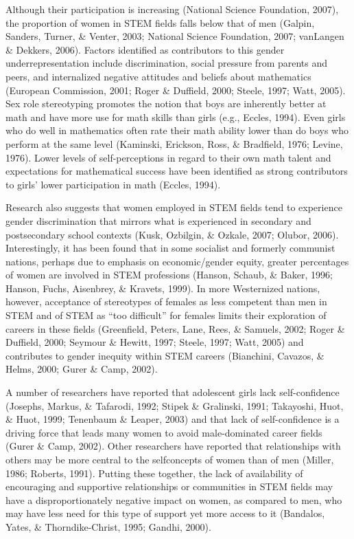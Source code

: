 \documentclass[11.5pt]{sig-alternate} %
\begin{document}
\begin{large}
Although their participation is increasing (National Science Foundation, 2007), the proportion of women in STEM fields falls below that of men (Galpin, Sanders, Turner, \& Venter, 2003; National Science Foundation, 2007; vanLangen \& Dekkers, 2006). Factors identified as contributors to this gender underrepresentation include discrimination, social pressure from parents and peers, and internalized negative attitudes and beliefs about mathematics (European Commission, 2001; Roger \& Duffield, 2000; Steele, 1997; Watt, 2005). Sex role stereotyping promotes the notion that boys are inherently better at math and have more use for math skills than girls (e.g., Eccles, 1994). Even girls who do well in mathematics often rate their math ability lower than do boys who perform at the same level (Kaminski, Erickson, Ross, \& Bradfield, 1976; Levine, 1976). Lower levels of self-perceptions in regard to their own math talent and expectations for mathematical success have been identified as strong contributors to girls’ lower participation in math (Eccles, 1994).  
 
Research also suggests that women employed in STEM fields tend to experience gender discrimination that mirrors what is experienced in secondary and postsecondary school contexts (Kusk, Ozbilgin, \& Ozkale, 2007; Olubor, 2006).  Interestingly, it has been found that in some socialist and formerly communist nations, perhaps due to emphasis on economic/gender equity, greater percentages of women are involved in STEM professions (Hanson, Schaub, \& Baker, 1996; Hanson, Fuchs, Aisenbrey, \& Kravets, 1999). In more Westernized nations, however, acceptance of stereotypes of females as less competent than men in STEM and of STEM as “too difficult” for females limits their exploration of careers in these fields (Greenfield, Peters, Lane, Rees, \& Samuels, 
2002; Roger \& Duffield, 2000; Seymour \& Hewitt, 1997; Steele, 1997; Watt, 2005) and contributes to gender inequity within STEM careers (Bianchini, Cavazos, \& Helms, 2000; Gurer \& Camp, 2002).  
 
A number of researchers have reported that adolescent girls lack self-confidence (Josephs, Markus, \& Tafarodi, 1992; Stipek \& 
Gralinski, 1991; Takayoshi, Huot, \& Huot, 1999; Tenenbaum \& Leaper, 2003) and that lack of self-confidence is a driving force that leads many women to avoid male-dominated career fields (Gurer \& Camp, 2002). Other researchers have reported that relationships with others may be more central to the selfconcepts of women than of men (Miller, 1986; Roberts, 1991). Putting these together, the lack of availability of encouraging and supportive relationships or communities in STEM fields may have a disproportionately negative impact on women, as compared to men, who may have less need for this type of support yet more access to it (Bandalos, Yates, \& Thorndike-Christ, 1995; Gandhi, 2000).  
 

\end{large}
\end{document}

